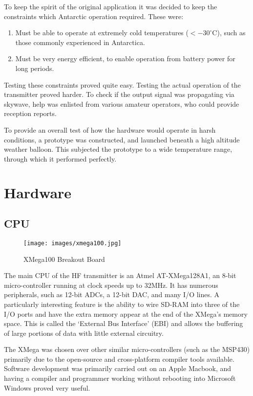 \documentclass[a4paper,12pt]{article}
\begin{document}
To keep the spirit of the original application it was decided to keep the constraints which Antarctic operation required. These were:
\begin{enumerate}
\item Must be able to operate at extremely cold temperatures ($<-30^\circ$C), such as those commonly experienced in Antarctica.
\item Must be very energy efficient, to enable operation from battery power for long periods.
\end{enumerate}

Testing these constraints proved quite easy. Testing the actual operation of the transmitter proved harder. To check if the output signal was propagating via skywave, help was enlisted from various amateur operators, who could provide reception reports. 

To provide an overall test of how the hardware would operate in harsh conditions, a prototype was constructed, and launched beneath a high altitude weather balloon. This subjected the prototype to a wide temperature range, through which it performed perfectly.


\newpage
\section{Hardware}

\subsection{CPU}
\begin{wrapfigure}{r}{0.3\textwidth}
  \begin{center}
    \texttt{[image: images/xmega100.jpg]}
  \end{center}
  \caption{XMega100 Breakout Board}
  \label{fig:xmega100}
\end{wrapfigure}
The main CPU of the HF transmitter is an Atmel AT-XMega128A1, an 8-bit micro-controller running at clock speeds up to 32MHz. It has numerous peripherals, such as 12-bit ADCs, a 12-bit DAC, and many I/O lines\citep{ref:xmega}. A particularly interesting feature is the ability to wire SD-RAM into three of the I/O ports and have the extra memory appear at the end of the XMega's memory space. This is called the `External Bus Interface' (EBI) and allows the buffering of large portions of data with little external circuitry.

The XMega was chosen over other similar micro-controllers (such as the MSP430) primarily due to the open-source and cross-platform compiler tools available. Software development was primarily carried out on an Apple Macbook, and having a compiler and programmer working without rebooting into Microsoft Windows proved very useful.
\end{document}
